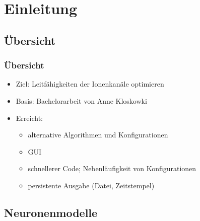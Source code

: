 \section{Einleitung}

\subsection{Übersicht}

\begin{frame}
  \frametitle{Übersicht}
  \begin{itemize}
  \item Ziel: Leitfähigkeiten der Ionenkanäle optimieren
  \item Basis: Bachelorarbeit von Anne Kloskowki
  \item Erreicht:
    \begin{itemize}
    \item alternative Algorithmen und Konfigurationen
    \item GUI
    \item schnellerer Code; Nebenläufigkeit von Konfigurationen
    \item persistente Ausgabe (Datei, Zeitstempel)
    \end{itemize}
  \end{itemize}
\end{frame}


\subsection{Neuronenmodelle}

